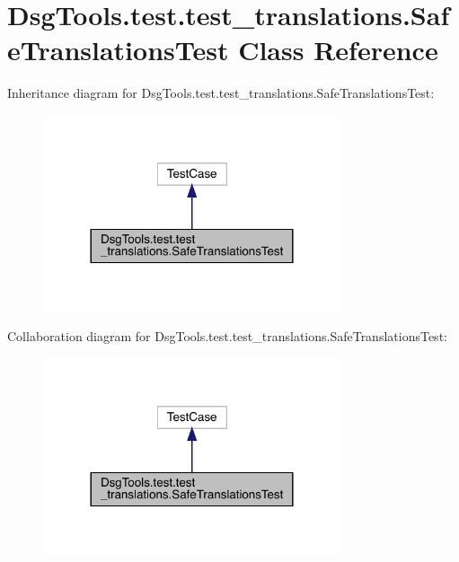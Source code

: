 \hypertarget{class_dsg_tools_1_1test_1_1test__translations_1_1_safe_translations_test}{}\section{Dsg\+Tools.\+test.\+test\+\_\+translations.\+Safe\+Translations\+Test Class Reference}
\label{class_dsg_tools_1_1test_1_1test__translations_1_1_safe_translations_test}


Inheritance diagram for Dsg\+Tools.\+test.\+test\+\_\+translations.\+Safe\+Translations\+Test\+:
\nopagebreak
\begin{figure}[H]
\begin{center}
\leavevmode
\includegraphics[width=248pt]{class_dsg_tools_1_1test_1_1test__translations_1_1_safe_translations_test__inherit__graph}
\end{center}
\end{figure}


Collaboration diagram for Dsg\+Tools.\+test.\+test\+\_\+translations.\+Safe\+Translations\+Test\+:
\nopagebreak
\begin{figure}[H]
\begin{center}
\leavevmode
\includegraphics[width=248pt]{class_dsg_tools_1_1test_1_1test__translations_1_1_safe_translations_test__coll__graph}
\end{center}
\end{figure}
